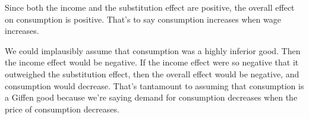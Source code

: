 \documentclass{article}
\begin{document}
\begin{enumerate}
Since both the income and the substitution effect are positive, the overall effect on consumption is positive. That's to say consumption increases when wage increases.

We could implausibly assume that consumption was a highly inferior good. Then the income effect would be negative. If the income effect were so negative that it outweighed the substitution effect, then the overall effect would be negative, and consumption would decrease. That's tantamount to assuming that consumption is a Giffen good because we're saying demand for consumption decreases when the price of consumption decreases.

\end{enumerate}
\end{document}
